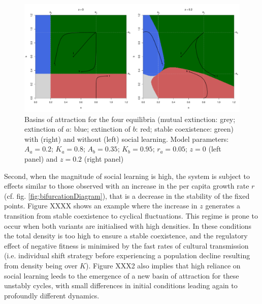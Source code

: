 \documentclass[review,authoryear]{elsarticle}
\begin{document}
\begin{figure}
  \centering
      \includegraphics[width=\columnwidth]{./figures/figure3.pdf}
  \caption{Basins of attraction for the four equilibria (mutual extinction: grey; extinction of $a$: blue; extinction of $b$: red; stable coexistence: green) with (right) and without (left) social learning. Model parameters: $A_a=0.2$; $K_a=0.8$; $A_b=0.35$; $K_b=0.95$; $r_a=0.05$; $z=0$ (left panel) and $z=0.2$ (right panel) }
    \label{fig:TransmissionBasin}
\end{figure}

Second, when the magnitude of social learning is high, the system is subject to effects similar to those observed with an increase in the per capita growth rate $r$ (cf. fig. \ref{fig:bifurcationDiagram}), that is a decrease in the stability of the fixed points. Figure XXXX shows an example where the increase in $z$ generates a transition from stable coexistence to cyclical fluctuations. %
This regime is prone to occur when both variants are initialised with high densities. %
In these conditions the total density is too high to ensure a stable coexistence, and the regulatory effect of negative fitness is minimised by the fast rates of cultural transmission (i.e. individual shift strategy before experiencing a population decline resulting from density being over $K$). Figure XXX2 also implies that high reliance on social learning leeds to the emergence of a new basin of attraction for these unstably cycles, with small differences in initial conditions leading again to profoundly different dynamics. 
\end{document}
